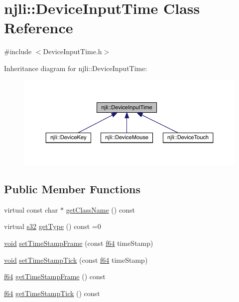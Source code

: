 \hypertarget{classnjli_1_1_device_input_time}{}\section{njli\+:\+:Device\+Input\+Time Class Reference}
\label{classnjli_1_1_device_input_time}


{\ttfamily \#include $<$Device\+Input\+Time.\+h$>$}



Inheritance diagram for njli\+:\+:Device\+Input\+Time\+:\nopagebreak
\begin{figure}[H]
\begin{center}
\leavevmode
\includegraphics[width=350pt]{classnjli_1_1_device_input_time__inherit__graph}
\end{center}
\end{figure}
\subsection*{Public Member Functions}
\begin{DoxyCompactItemize}
\item 
virtual const char $\ast$ \mbox{\hyperlink{classnjli_1_1_device_input_time_a2e5cdadd44d1ee2d7d7136e91f2bcafb}{get\+Class\+Name}} () const
\item 
virtual \mbox{\hyperlink{_util_8h_aa62c75d314a0d1f37f79c4b73b2292e2}{s32}} \mbox{\hyperlink{classnjli_1_1_device_input_time_a69e4bb4be69f3ac53f4514a58fd61021}{get\+Type}} () const =0
\item 
\mbox{\hyperlink{_thread_8h_af1e856da2e658414cb2456cb6f7ebc66}{void}} \mbox{\hyperlink{classnjli_1_1_device_input_time_a03eca1e2b0725a5be925f6ec5cd33b7b}{set\+Time\+Stamp\+Frame}} (const \mbox{\hyperlink{_util_8h_a94dab5770726ccbef8c7d026cfbdf8e5}{f64}} time\+Stamp)
\item 
\mbox{\hyperlink{_thread_8h_af1e856da2e658414cb2456cb6f7ebc66}{void}} \mbox{\hyperlink{classnjli_1_1_device_input_time_a6a06c7800f1925631dafb54671b2abd7}{set\+Time\+Stamp\+Tick}} (const \mbox{\hyperlink{_util_8h_a94dab5770726ccbef8c7d026cfbdf8e5}{f64}} time\+Stamp)
\item 
\mbox{\hyperlink{_util_8h_a94dab5770726ccbef8c7d026cfbdf8e5}{f64}} \mbox{\hyperlink{classnjli_1_1_device_input_time_ad5e181aebc12a0f9c662a9af1d559bd9}{get\+Time\+Stamp\+Frame}} () const
\item 
\mbox{\hyperlink{_util_8h_a94dab5770726ccbef8c7d026cfbdf8e5}{f64}} \mbox{\hyperlink{classnjli_1_1_device_input_time_ad68f0958e6f363d09772286650891b3b}{get\+Time\+Stamp\+Tick}} () const
\end{DoxyCompactItemize}
